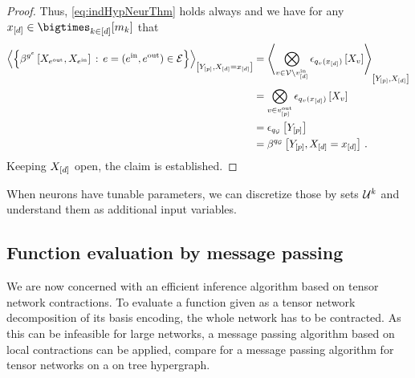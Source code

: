 \begin{proof}
    Thus, \eqref{eq:indHypNeurThm} holds always and we have for any $\shortcatindicesin$ that
    \begin{align*}
        \contractionof{\left\{\bencodingofat{\secexfunctionof{\edge}}{\catvariableof{\outgoingnodes},\catvariableof{\incomingnodes}} \wcols \edge=(\incomingnodes,\outgoingnodes)\in\edges\right\}
        }{\headvariables,\indexedshortcatvariables}
        &= \contractionof{
            \bigotimes_{\node\in\nodes\setexcept{\node^{\insymbol}_{[\atomorder]}}} \onehotmapofat{\exfunctionof{\node}(\shortcatindices)}{\catvariableof{\node}}
        }{\headvariables,\shortcatvariables} \\
        & = \bigotimes_{\node\in\node^{\outsymbol}_{[\seldim]}}
        \onehotmapofat{\exfunctionof{\node}(\shortcatindices)}{\catvariableof{\node}} \\
        & = \onehotmapofat{\exfunctionof{\graph}}{\headvariables} \\
        & = \bencodingofat{\exfunctionof{\graph}}{\headvariables,\indexedshortcatvariables} \, .
    \end{align*}
    Keeping $X_{[d]}$ open, the claim is established.
\end{proof}

When neurons have tunable parameters, we can discretize those by sets $\mathcal{U}^{k}$ and understand them as additional input variables.



\subsection{Function evaluation by message passing}

We are now concerned with an efficient inference algorithm based on tensor network contractions. To evaluate a function given as a tensor network decomposition of its basis encoding, the whole network has to be contracted. As this can be infeasible for large networks, a message passing algorithm based on local contractions can be applied, compare  for a message passing algorithm for tensor networks on a on tree hypergraph.

